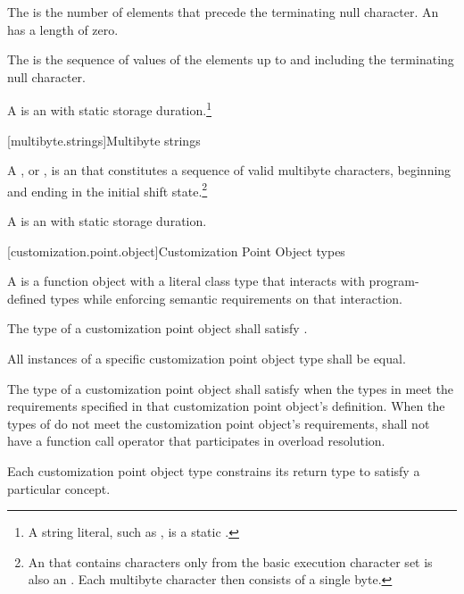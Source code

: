 \pnum
The 
is the number of elements that
precede the terminating null character.
An 
has a length of zero.

\pnum
The 
is the sequence of values of the
elements up to and including the terminating null character.

\pnum
A 
is an \ntbs{} with
static storage duration.\footnote{A string literal, such as
,
is a static \ntbs{}.}

[multibyte.strings]{Multibyte strings}

%
\pnum
A ,
or \ntmbs{},
is an \ntbs{} that constitutes a
sequence of valid multibyte characters, beginning and ending in the initial
shift state.\footnote{An \ntbs{} that contains characters only from the
basic execution character set is also an \ntmbs{}.
Each multibyte character then
consists of a single byte.}

\pnum
A 
is an \ntmbs{} with static storage duration.

[customization.point.object]{Customization Point Object types}

\pnum
A  is a function object
with a literal class type that interacts with program-defined types while
enforcing semantic requirements on that interaction.

\pnum
The type of a customization point object shall satisfy
.

\pnum
All instances of a specific customization point object type shall
be equal.

\pnum
The type  of a customization point object shall satisfy
when the types in  meet the requirements specified in that
customization point object's definition. When the types of  do
not meet the customization point object's requirements,  shall not have
a function call operator that participates in overload resolution.

\pnum
Each customization point object type constrains its return type to satisfy a
particular concept.

